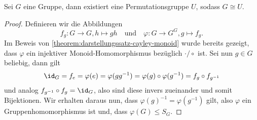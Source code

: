 \begin{theorem}\label{satz:darstellungssatz-cayley-gruppen}
    Sei $G$ eine Gruppe, dann existiert eine Permutationsgruppe $U$, sodass $G \cong U$.
\end{theorem}
\begin{proof}
    Definieren wir die Abbildungen $$f_g: G \to G, h \mapsto gh \quad\text{und}\quad \varphi: G \to G^G, g \mapsto f_g.$$
    Im Beweis von \cref{theorem:darstellungssatz-cayley-monoid} wurde bereits gezeigt, dass $\varphi$ ein injektiver Monoid-Homomorphismus bezüglich $\cdot / \circ$ ist. Sei nun $g \in G$ beliebig, dann gilt $$ \id_G = f_e = \varphi(e) = \varphi(g g^{-1}) = \varphi(g) \circ \varphi(g^{-1}) = f_g \circ f_{g^{-1}}$$
    und analog $f_{g^{-1}} \circ f_g = \id_G$, also sind diese invers zueinander und somit Bijektionen. Wir erhalten daraus nun, dass $\varphi(g)^{-1} = \varphi(g^{-1})$ gilt, also $\varphi$ ein Gruppenhomomorphismus ist und, dass $\varphi(G) \le S_G$.
\end{proof}





